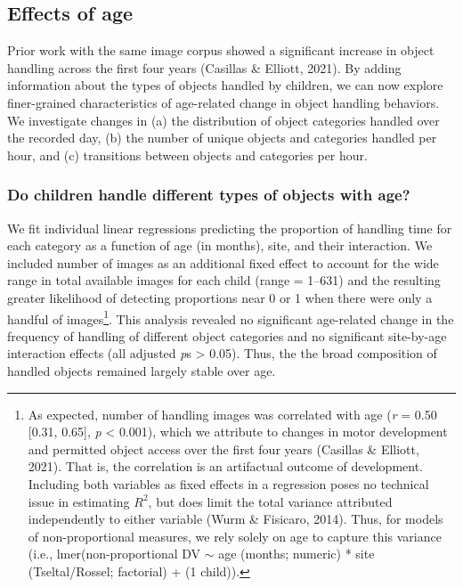 \documentclass[10pt, letterpaper]{article}
\begin{document}
\hypertarget{effects-of-age}{%
\subsection{Effects of age}\label{effects-of-age}}

Prior work with the same image corpus showed a significant increase in
object handling across the first four years (Casillas \& Elliott, 2021).
By adding information about the types of objects handled by children, we
can now explore finer-grained characteristics of age-related change in
object handling behaviors. We investigate changes in (a) the
distribution of object categories handled over the recorded day, (b) the
number of unique objects and categories handled per hour, and (c)
transitions between objects and categories per hour.

\hypertarget{do-children-handle-different-types-of-objects-with-age}{%
\subsubsection{Do children handle different types of objects with
age?}\label{do-children-handle-different-types-of-objects-with-age}}

We fit individual linear regressions predicting the proportion of
handling time for each category as a function of age (in months), site,
and their interaction. We included number of images as an additional
fixed effect to account for the wide range in total available images for
each child (range = 1--631) and the resulting greater likelihood of
detecting proportions near 0 or 1 when there were only a handful of
images\footnote{As expected, number of handling images was correlated
  with age (\emph{r} = 0.50 {[}0.31, 0.65{]}, \emph{p} \textless{}
  0.001), which we attribute to changes in motor development and
  permitted object access over the first four years (Casillas \&
  Elliott, 2021). That is, the correlation is an artifactual outcome of
  development. Including both variables as fixed effects in a regression
  poses no technical issue in estimating \(R^{2}\), but does limit the
  total variance attributed independently to either variable (Wurm \&
  Fisicaro, 2014). Thus, for models of non-proportional measures, we
  rely solely on age to capture this variance (i.e.,
  lmer(non-proportional DV \({\sim}\) age (months; numeric) * site
  (Tseltal/Rossel; factorial) + (1 \textbar{} child)).}. This analysis
revealed no significant age-related change in the frequency of handling
of different object categories and no significant site-by-age
interaction effects (all adjusted \emph{p}s \textgreater{} 0.05). Thus,
the the broad composition of handled objects remained largely stable
over age.
\end{document}
